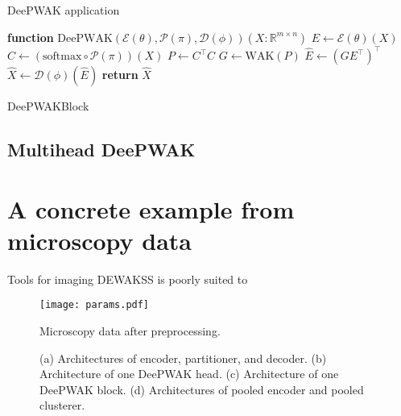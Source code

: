 \documentclass{article}
\begin{document}
\begin{algorithm}
  \caption{DeePWAK application}\label{alg:cap}
  \begin{algorithmic}[1]
    \State \textbf{function} $\mathrm{DeePWAK}(\mathcal{E}(\theta), \mathcal{P}(\pi), \mathcal{D}(\phi))(X : \mathbb{R}^{m \times n})${
    \State $E \gets \mathcal{E}(\theta)(X)$
    \State $C \gets (\mathrm{softmax} \circ \mathcal{P}(\pi))(X)$
    \State $P \gets C^\top C$
    \State $G \gets \mathrm{WAK}(P)$
    \State $\hat{E} \gets (GE^\top)^\top$
    \State $\hat{X} \gets \mathcal{D}(\phi)(\hat{E})$
    \State \textbf{return} $\hat{X}$
    }
  \end{algorithmic}
\end{algorithm}

\begin{algorithm}
  \caption{DeePWAKBlock}
\end{algorithm}
  
\subsection{Multihead DeePWAK}

\section{A concrete example from microscopy data}
Tools for imaging 
DEWAKSS is poorly suited to 

\begin{figure}
  \texttt{[image: params.pdf]}
    \caption{Microscopy data after preprocessing. }
    \label{fig:}
\end{figure}
  
\begin{figure}
     \begin{subfigure}[b]{0.5\textwidth}
        
         \caption{}
         \label{fig:}
     \end{subfigure}
     \hfill
     \begin{subfigure}[b]{0.5\textwidth}
        
         \caption{}
         \label{fig:}
     \end{subfigure}

     \vspace{1cm}
     \begin{subfigure}[b]{0.5\textwidth}
        
         \caption{}
         \label{fig:}
     \end{subfigure}
     \hfill
     \begin{subfigure}[b]{\textwidth}
       
       \caption{}
       \label{fig:}
     \end{subfigure}
     

     \caption{(a) Architectures of encoder, partitioner, and decoder.
       (b) Architecture of one DeePWAK head.
       (c) Architecture of one DeePWAK block.
       (d) Architectures of pooled encoder and pooled clusterer.
       }
     \label{fig:}
\end{figure}
\end{document}
